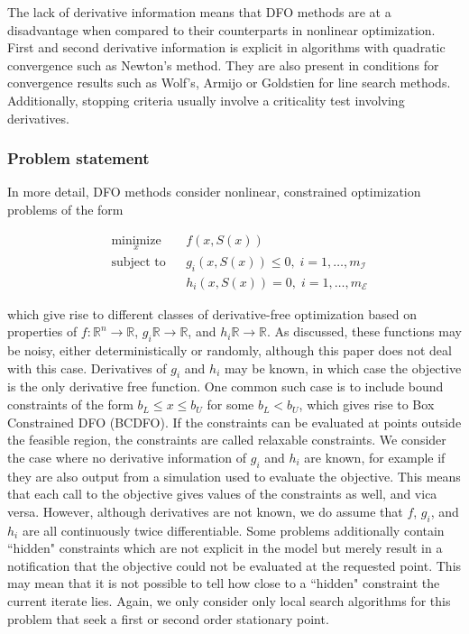 \documentclass{article}
\begin{document}
The lack of derivative information means that DFO methods are at a disadvantage when compared to their counterparts in nonlinear optimization.
First and second derivative information is explicit in algorithms with quadratic convergence such as Newton's method.
They are also present in conditions for convergence results such as Wolf's, Armijo or Goldstien for line search methods.
Additionally, stopping criteria usually involve a criticality test involving derivatives.

\subsubsection{Problem statement}

In more detail, DFO methods consider nonlinear, constrained optimization problems of the form

\begin{equation*}
\begin{aligned}
& \underset{x}{\text{minimize}} & & f(x, S(x)) \\
& \text{subject to} & & g_i(x, S(x)) \leq 0, \; i = 1, \ldots, m_{\mathcal{I}} \\
& & & h_i(x, S(x)) = 0, \; i = 1, \ldots, m_{\mathcal{E}}
\end{aligned}
\end{equation*}

which give rise to different classes of derivative-free optimization based on properties of $f : \mathbb{R}^n \to \mathbb{R}$, $g_i \mathbb{R} \to \mathbb{R}$, and $h_i \mathbb{R} \to \mathbb{R}$.
As discussed, these functions may be noisy, either deterministically or randomly, although this paper does not deal with this case.
Derivatives of $g_i$ and $h_i$ may be known, in which case the objective is the only derivative free function.
One common such case is to include bound constraints of the form $b_{L} \le x \le b_{U}$ for some $b_{L} < b_{U}$, which gives rise to Box Constrained DFO (BCDFO).
If the constraints can be evaluated at points outside the feasible region, the constraints are called relaxable constraints.
We consider the case where no derivative information of $g_i$ and $h_i$ are known, for example if they are also output from a simulation used to evaluate the objective.
This means that each call to the objective gives values of the constraints as well, and vica versa.
However, although derivatives are not known, we do assume that $f$, $g_i$, and $h_i$ are all continuously twice differentiable.
Some problems additionally contain ``hidden" constraints which are not explicit in the model but merely result in a notification that the objective could not be evaluated at the requested point.
This may mean that it is not possible to tell how close to a ``hidden" constraint the current iterate lies.
Again, we only consider only local search algorithms for this problem that seek a first or second order stationary point.
\end{document}
